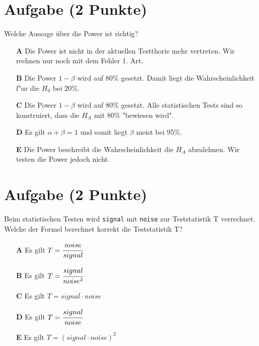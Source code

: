 \documentclass[a4paper, 10pt]{scrartcl}\usepackage[]{graphicx}\usepackage[]{xcolor}
\begin{document}
\section{Aufgabe \hfill (2 Punkte)}

Welche Aussage {\"u}ber die Power ist richtig?



\begin{enumerate}
\item [\textbf{A} \msquare] Die Power ist nicht in der aktuellen Testthorie mehr vertreten. Wir rechnen nur noch mit dem Fehler 1. Art.
\item [\textbf{B} \msquare] Die Power $1-\beta$ wird auf 80\% gesetzt. Damit liegt die Wahrscheinlichkeit f{"u}r die $H_0$ bei 20\%.
\item [\textbf{C} \msquare] Die Power $1-\beta$ wird auf 80\% gesetzt. Alle statistischen Tests sind so konstruiert, dass die $H_A$ mit 80\% "bewiesen wird".
\item [\textbf{D} \msquare] Es gilt $\alpha + \beta = 1$ und somit liegt $\beta$ meist bei 95\%.
\item [\textbf{E} \msquare] Die Power beschreibt die Wahrscheinlichkeit die $H_A$ abzulehnen. Wir testen die Power jedoch nicht.
\end{enumerate}

\section{Aufgabe \hfill (2 Punkte)}

Beim statistischen Testen wird \texttt{signal} mit \texttt{noise} zur
Teststatistik T verrechnet. Welche der Formel berechnet korrekt die
Teststatistik T?



\begin{enumerate}
\item [\textbf{A} \msquare] Es gilt $T = \cfrac{noise}{signal}$
\item [\textbf{B} \msquare] Es gilt $T = \cfrac{signal}{noise^2}$
\item [\textbf{C} \msquare] Es gilt $T = signal \cdot noise$
\item [\textbf{D} \msquare] Es gilt $T = \cfrac{signal}{noise}$
\item [\textbf{E} \msquare] Es gilt $T = (signal \cdot noise)^2$
\end{enumerate}

\end{document}
